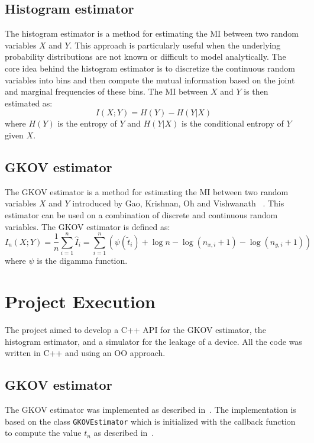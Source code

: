 \documentclass[12pt]{article}
\begin{document}
    \subsection{Histogram estimator}\label{subsec:hist}
    The histogram estimator is a method for estimating the MI between two random variables $X$ and $Y$.
    This approach is particularly useful when the underlying probability distributions are not known or difficult to model analytically.
    The core idea behind the histogram estimator is to discretize the continuous random variables into bins and then compute the mutual information based on the joint and marginal frequencies of these bins.
    The MI between $X$ and $Y$ is then estimated as:
    \begin{equation}
        I(X;Y) = H(Y) - H(Y|X)\label{eq:hist}
    \end{equation}
    where $H(Y)$ is the entropy of $Y$ and $H(Y|X)$ is the conditional entropy of $Y$ given $X$.

    \subsection{GKOV estimator}\label{subsec:gkov}
    The GKOV estimator is a method for estimating the MI between two random variables $X$ and $Y$ introduced by Gao, Krishnan, Oh and Vishwanath ~\cite{gkov}.
    This estimator can be used on a combination of discrete and continuous random variables.
    The GKOV estimator is defined as:
    \begin{equation}
        I_n(X;Y) = \frac{1}{n} \sum_{i=1}^n \hat{I}_i = \sum_{i=1}^n \left( \psi(\tilde{t}_i) + \log n - \log(n_{x,i}+1) - \log(n_{y,i}+1) \right)\label{eq:gkov}
    \end{equation}
    where $\psi$ is the digamma function.

    \section{Project Execution}\label{sec:execution}
    The project aimed to develop a C++ API for the GKOV estimator, the histogram estimator, and a simulator for the leakage of a device.
    All the code was written in C++ and using an OO approach.

    \subsection{GKOV estimator}\label{subsec:gkov_impl}
    The GKOV estimator was implemented as described in~\cite{gkov}.
    The implementation is based on the class \texttt{GKOVEstimator} which is initialized with the callback function to compute the value $t_n$ as described in~\cite{roy_leakage_2022}.


    \newpage
    
    
\end{document}
